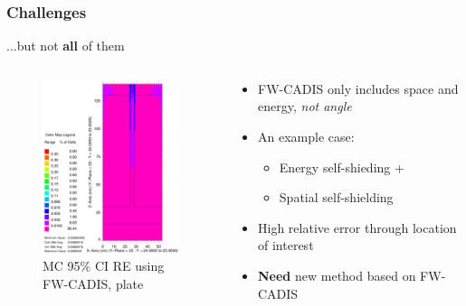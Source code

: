 \documentclass[xcolor=x11names,compress]{beamer}
\renewcommand{\(}{\begin{columns}}
\renewcommand{\)}{\end{columns}}
\newcommand{\<}[1]{\begin{column}{#1}}
\renewcommand{\>}{\end{column}}
\begin{document}
\begin{frame}[fragile]
  \frametitle{Challenges}

	...but not \textbf{all} of them
	\begin{columns}
  	\begin{column}{0.45\textwidth}
  	\begin{center}
  	\begin{figure}
  		\includegraphics[height=2in,clip]{../figs/streaming-Air}
  		\caption{MC 95\% CI RE using FW-CADIS, plate \cite{Wilson2015}}
  	\end{figure}
	\end{center}
  	\end{column}
 	\begin{column}{0.5\textwidth}
  	\begin{center}
  	\begin{itemize}
		\item FW-CADIS only includes space and energy, \textit{not angle} \vspace*{0.5 em}
		\pause
		\item An example case: 
		\begin{itemize}
		    \item Energy self-shieding + 
		    \item Spatial self-shielding
		\end{itemize}
		\item High relative error through location of interest \vspace*{0.5 em}
		\pause
		\item \textbf{Need} new method based on FW-CADIS
	\end{itemize}
  	\end{center}
  	\end{column}
	\end{columns}

\end{frame}


\end{document}
